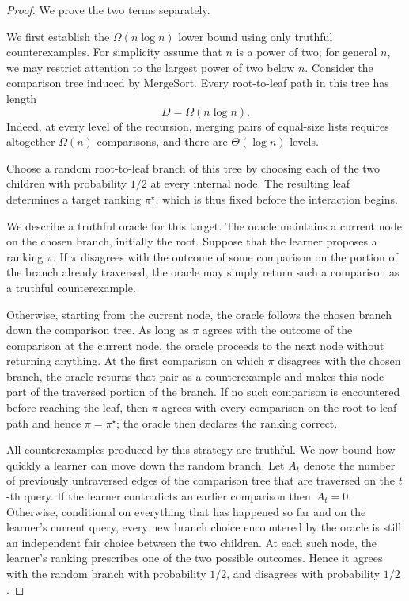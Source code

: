 \documentclass[10pt,a4paper]{amsart}
\begin{document}
\begin{proof}
We prove the two terms separately.

We first establish the $\Omega(n\log n)$ lower bound using only truthful
counterexamples. For simplicity assume that $n$ is a power of two; for
general $n$, we may restrict attention to the largest power of two below
$n$. Consider the comparison tree induced by MergeSort. Every
root-to-leaf path in this tree has length
\[
    D=\Omega(n\log n).
\]
Indeed, at every level of the recursion, merging pairs of equal-size lists
requires altogether $\Omega(n)$ comparisons, and there are
$\Theta(\log n)$ levels.

Choose a random root-to-leaf branch of this tree by choosing each of the two
children with probability $1/2$ at every internal node. The resulting leaf
determines a target ranking $\pi^\star$, which is thus fixed before the
interaction begins.

We describe a truthful oracle for this target. The oracle maintains a
current node on the chosen branch, initially the root. Suppose that the
learner proposes a ranking $\pi$. If $\pi$ disagrees with the outcome of
some comparison on the portion of the branch already traversed, the oracle
may simply return such a comparison as a truthful counterexample.

Otherwise, starting from the current node, the oracle follows the chosen
branch down the comparison tree. As long as $\pi$ agrees with the outcome
of the comparison at the current node, the oracle proceeds to the next
node without returning anything. At the first comparison on which $\pi$
disagrees with the chosen branch, the oracle returns that pair as a
counterexample and makes this node part of the traversed portion of the
branch. If no such comparison is encountered before reaching the leaf,
then $\pi$ agrees with every comparison on the root-to-leaf path and hence
$\pi=\pi^\star$; the oracle then declares the ranking correct.

All counterexamples produced by this strategy are truthful. We now bound
how quickly a learner can move down the random branch. Let $A_t$ denote the
number of previously untraversed edges of the comparison tree that are traversed on
the $t$-th query. If the learner contradicts an earlier comparison then~$A_t=0$. Otherwise, conditional on everything that has happened so far and
on the learner's current query, every new branch choice encountered by the
oracle is still an independent fair choice between the two children. At
each such node, the learner's ranking prescribes one of the two possible
outcomes. Hence it agrees with the random branch with probability $1/2$,
and disagrees with probability $1/2$.


\end{proof}
\end{document}
